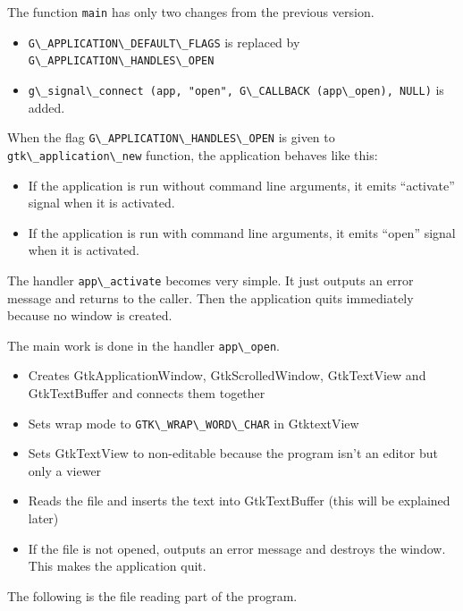 The function \passthrough{\lstinline!main!} has only two changes from
the previous version.

\begin{itemize}
\tightlist
\item
  \passthrough{\lstinline!G\_APPLICATION\_DEFAULT\_FLAGS!} is replaced
  by \passthrough{\lstinline!G\_APPLICATION\_HANDLES\_OPEN!}
\item
  \passthrough{\lstinline!g\_signal\_connect (app, "open", G\_CALLBACK (app\_open), NULL)!}
  is added.
\end{itemize}

When the flag \passthrough{\lstinline!G\_APPLICATION\_HANDLES\_OPEN!} is
given to \passthrough{\lstinline!gtk\_application\_new!} function, the
application behaves like this:

\begin{itemize}
\tightlist
\item
  If the application is run without command line arguments, it emits
  ``activate'' signal when it is activated.
\item
  If the application is run with command line arguments, it emits
  ``open'' signal when it is activated.
\end{itemize}

The handler \passthrough{\lstinline!app\_activate!} becomes very simple.
It just outputs an error message and returns to the caller. Then the
application quits immediately because no window is created.

The main work is done in the handler
\passthrough{\lstinline!app\_open!}.

\begin{itemize}
\tightlist
\item
  Creates GtkApplicationWindow, GtkScrolledWindow, GtkTextView and
  GtkTextBuffer and connects them together
\item
  Sets wrap mode to \passthrough{\lstinline!GTK\_WRAP\_WORD\_CHAR!} in
  GtktextView
\item
  Sets GtkTextView to non-editable because the program isn't an editor
  but only a viewer
\item
  Reads the file and inserts the text into GtkTextBuffer (this will be
  explained later)
\item
  If the file is not opened, outputs an error message and destroys the
  window. This makes the application quit.
\end{itemize}

The following is the file reading part of the program.


